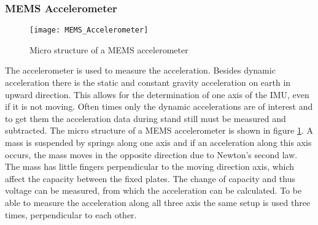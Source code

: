 \subsubsection{MEMS Accelerometer}
\begin{figure}[htb]
	\centering
	\texttt{[image: MEMS\_Accelerometer]}
	\caption{Micro structure of a MEMS accelerometer }
	\label{fig:MEMS_Accelerometer}
\end{figure}
The accelerometer is used to measure the acceleration.
Besides dynamic acceleration there is the static and constant gravity acceleration on earth in upward direction. 
This allows for the determination of one axis of the IMU, even if it is not moving.
Often times only the dynamic accelerations are of interest and to get them the acceleration data during stand still must be measured and subtracted.
The micro structure of a MEMS accelerometer is shown in figure \ref{fig:MEMS_Accelerometer}.
A mass is suspended by springs along one axis and if an acceleration along this axis occurs, the mass moves in the opposite direction due to Newton's second law.
The mass has little fingers perpendicular to the moving direction axis, which affect the capacity between the fixed plates.
The change of capacity and thus voltage can be measured, from which the acceleration can be calculated.
To be able to measure the acceleration along all three axis the same setup is used three times, perpendicular to each other.

